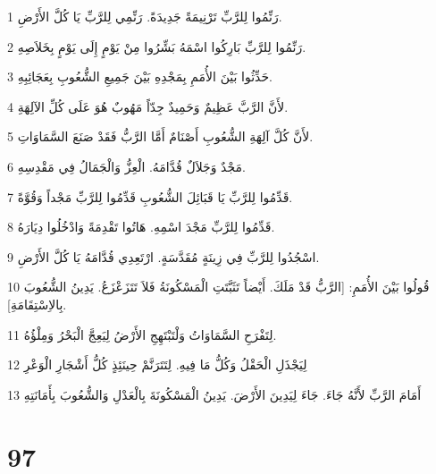 \par 1 رَنِّمُوا لِلرَّبِّ تَرْنِيمَةً جَدِيدَةً. رَنِّمِي لِلرَّبِّ يَا كُلَّ الأَرْضِ.
\par 2 رَنِّمُوا لِلرَّبِّ بَارِكُوا اسْمَهُ بَشِّرُوا مِنْ يَوْمٍ إِلَى يَوْمٍ بِخَلاَصِهِ.
\par 3 حَدِّثُوا بَيْنَ الأُمَمِ بِمَجْدِهِ بَيْنَ جَمِيعِ الشُّعُوبِ بِعَجَائِبِهِ.
\par 4 لأَنَّ الرَّبَّ عَظِيمٌ وَحَمِيدٌ جِدّاً مَهُوبٌ هُوَ عَلَى كُلِّ الآلِهَةِ.
\par 5 لأَنَّ كُلَّ آلِهَةِ الشُّعُوبِ أَصْنَامٌ أَمَّا الرَّبُّ فَقَدْ صَنَعَ السَّمَاوَاتِ.
\par 6 مَجْدٌ وَجَلاَلٌ قُدَّامَهُ. الْعِزُّ وَالْجَمَالُ فِي مَقْدِسِهِ.
\par 7 قَدِّمُوا لِلرَّبِّ يَا قَبَائِلَ الشُّعُوبِ قَدِّمُوا لِلرَّبِّ مَجْداً وَقُوَّةً.
\par 8 قَدِّمُوا لِلرَّبِّ مَجْدَ اسْمِهِ. هَاتُوا تَقْدِمَةً وَادْخُلُوا دِيَارَهُ.
\par 9 اسْجُدُوا لِلرَّبِّ فِي زِينَةٍ مُقَدَّسَةٍ. ارْتَعِدِي قُدَّامَهُ يَا كُلَّ الأَرْضِ.
\par 10 قُولُوا بَيْنَ الأُمَمِ: [الرَّبُّ قَدْ مَلَكَ. أَيْضاً تَثَبَّتَتِ الْمَسْكُونَةُ فَلاَ تَتَزَعْزَعُ. يَدِينُ الشُّعُوبَ بِالاِسْتِقَامَةِ].
\par 11 لِتَفْرَحِ السَّمَاوَاتُ وَلْتَبْتَهِجِ الأَرْضُ لِيَعِجَّ الْبَحْرُ وَمِلْؤُهُ.
\par 12 لِيَجْذَلِ الْحَقْلُ وَكُلُّ مَا فِيهِ. لِتَتَرَنَّمْ حِينَئِذٍ كُلُّ أَشْجَارِ الْوَعْرِ
\par 13 أَمَامَ الرَّبِّ لأَنَّهُ جَاءَ. جَاءَ لِيَدِينَ الأَرْضَ. يَدِينُ الْمَسْكُونَةَ بِالْعَدْلِ وَالشُّعُوبَ بِأَمَانَتِهِ

\chapter{97}

